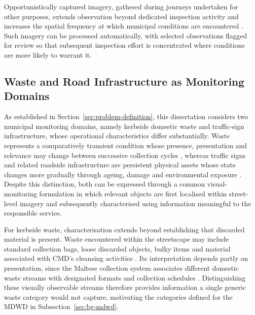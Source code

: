 Opportunistically captured imagery, gathered during journeys undertaken for other purposes, extends observation beyond dedicated inspection activity and increases the spatial frequency at which municipal conditions are encountered \cite{BG7-driveby-sensing,BG10-vehicle-sensing}. Such imagery can be processed automatically, with selected observations flagged for review so that subsequent inspection effort is concentrated where conditions are more likely to warrant it.

\subsection{Waste and Road Infrastructure as Monitoring Domains}
\label{sec:bg-monitoring-domains}
As established in Section~\ref{sec:problem-definition}, this dissertation considers two municipal monitoring domains, namely kerbside domestic waste and traffic-sign infrastructure, whose operational characteristics differ substantially. Waste represents a comparatively transient condition whose presence, presentation and relevance may change between successive collection cycles \cite{wastecollection2026web,era2023web}, whereas traffic signs and related roadside infrastructure are persistent physical assets whose state changes more gradually through ageing, damage and environmental exposure \cite{BG14-sign-degradation,BG5-sign-monitoring}. Despite this distinction, both can be expressed through a common visual-monitoring formulation in which relevant objects are first localised within street-level imagery and subsequently characterised using information meaningful to the responsible service.

For kerbside waste, characterisation extends beyond establishing that discarded material is present. Waste encountered within the streetscape may include standard collection bags, loose discarded objects, bulky items and material associated with \gls{CMD}'s cleansing activities \cite{BG15-mdwd,wasteserv2026web}. Its interpretation depends partly on presentation, since the Maltese collection system associates different domestic waste streams with designated formats and collection schedules \cite{wastecollection2026web,era2023web}. Distinguishing these visually observable streams therefore provides information a single generic waste category would not capture, motivating the categories defined for the \gls{MDWD} in Subsection~\ref{sec:bg-mdwd}.

